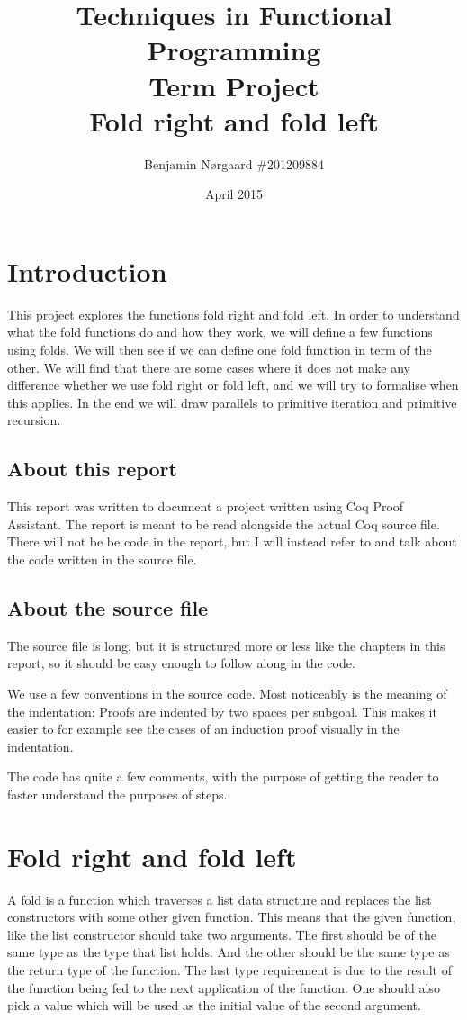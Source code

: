 \documentclass[a4paper]{article}
\title{Techniques in Functional Programming\\
Term Project\\
Fold right and fold left}
\author{Benjamin Nørgaard \#201209884}
\date{April 2015}
\begin{document}
\maketitle
\tableofcontents
\clearpage
\section{Introduction}
This project explores the functions fold right and fold left. In order to
understand what the fold functions do and how they work, we will define a few
functions using folds. We will then see if we can define one fold function in
term of the other. We will find that there are some cases where it does not make
any difference whether we use fold right or fold left, and we will try to
formalise when this applies. In the end we will draw parallels to primitive
iteration and primitive recursion.

\subsection{About this report}
This report was written to document a project written using Coq Proof Assistant.
The report is meant to be read alongside the actual Coq source file. There will
not be be code in the report, but I will instead refer to and talk about the
code written in the source file.

\subsection{About the source file}
The source file is long, but it is structured more or less like the chapters in
this report, so it should be easy enough to follow along in the code.

We use a few conventions in the source code. Most noticeably is the meaning of
the indentation: Proofs are indented by two spaces per subgoal. This makes it
easier to for example see the cases of an induction proof visually in the
indentation.

The code has quite a few comments, with the purpose of getting the reader to
faster understand the purposes of steps.

\section{Fold right and fold left}
A fold is a function which traverses a list data structure and replaces the list
constructors with some other given function. This means that the given function,
like the list constructor should take two arguments. The first should be of the
same type as the type that list holds. And the other should be the same type as
the return type of the function.  The last type requirement is due to the result
of the function being fed to the next application of the function. One should
also pick a value which will be used as the initial value of the second
argument.
\end{document}
